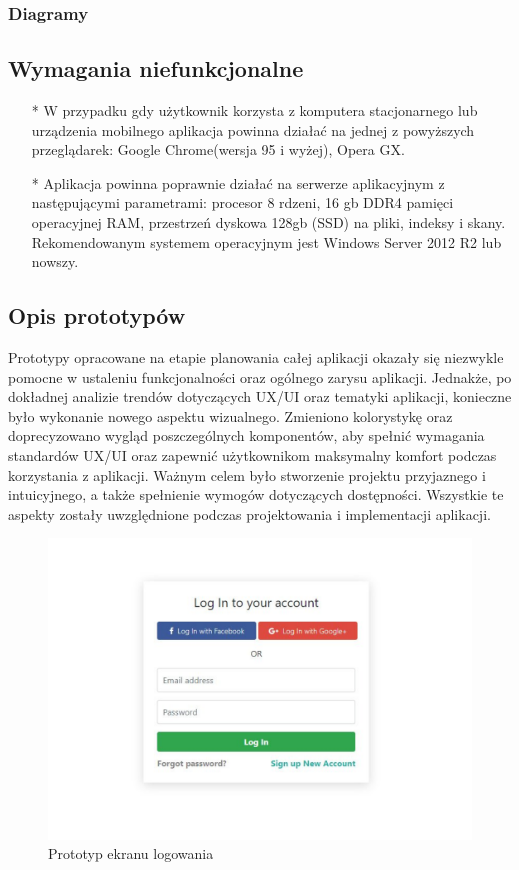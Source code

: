 \subsubsection{Diagramy}
\clearpage

\subsection{Wymagania niefunkcjonalne}
\begin{itemize}
    \item[*] W przypadku gdy użytkownik korzysta z komputera stacjonarnego lub urządzenia mobilnego aplikacja powinna działać na jednej z powyższych przeglądarek: Google Chrome(wersja 95 i wyżej), Opera GX. 
    \item[*] Aplikacja powinna poprawnie działać na serwerze aplikacyjnym z następującymi parametrami: procesor 8 rdzeni, 16 gb DDR4 pamięci operacyjnej RAM, przestrzeń dyskowa 128gb (SSD) na pliki, indeksy i skany. Rekomendowanym systemem operacyjnym jest Windows Server 2012 R2 lub nowszy.
\end{itemize}
\clearpage

\subsection{Opis prototypów}
Prototypy opracowane na etapie planowania całej aplikacji okazały się niezwykle pomocne w ustaleniu funkcjonalności oraz ogólnego zarysu aplikacji. Jednakże, po dokładnej analizie trendów dotyczących UX/UI oraz tematyki aplikacji, konieczne było wykonanie nowego aspektu wizualnego. Zmieniono kolorystykę oraz doprecyzowano wygląd poszczególnych komponentów, aby spełnić wymagania standardów UX/UI oraz zapewnić użytkownikom maksymalny komfort podczas korzystania z aplikacji. Ważnym celem było stworzenie projektu przyjaznego i intuicyjnego, a także spełnienie wymogów dotyczących dostępności. Wszystkie te aspekty zostały uwzględnione podczas projektowania i implementacji aplikacji.

\begin{figure}[h]
    \centering
    \includegraphics[width=1\textwidth]{Obrazy/prototypy/logowanie.png}
    \caption{Prototyp ekranu logowania}
    \label{fig:my_label}
\end{figure}

